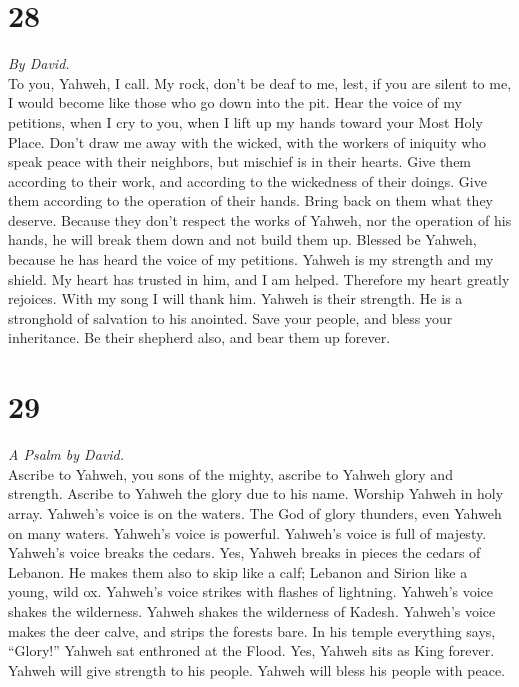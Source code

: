 \hypertarget{section-27}{%
\section{28}\label{section-27}}

\emph{By David.}\\
 To you, Yahweh, I call. My rock, don't be deaf to me,
lest, if you are silent to me, I would become like those who go down
into the pit.  Hear the voice of my petitions, when I cry
to you, when I lift up my hands toward your Most Holy Place.
 Don't draw me away with the wicked, with the workers of
iniquity who speak peace with their neighbors, but mischief is in their
hearts.  Give them according to their work, and according
to the wickedness of their doings. Give them according to the operation
of their hands. Bring back on them what they deserve. 
Because they don't respect the works of Yahweh, nor the operation of his
hands, he will break them down and not build them up. 
Blessed be Yahweh, because he has heard the voice of my petitions.
 Yahweh is my strength and my shield. My heart has trusted
in him, and I am helped. Therefore my heart greatly rejoices. With my
song I will thank him.  Yahweh is their strength. He is a
stronghold of salvation to his anointed.  Save your
people, and bless your inheritance. Be their shepherd also, and bear
them up forever.

\hypertarget{section-28}{%
\section{29}\label{section-28}}

\emph{A Psalm by David.}\\
 Ascribe to Yahweh, you sons of the mighty, ascribe to
Yahweh glory and strength.  Ascribe to Yahweh the glory
due to his name. Worship Yahweh in holy array.  Yahweh's
voice is on the waters. The God of glory thunders, even Yahweh on many
waters.  Yahweh's voice is powerful. Yahweh's voice is
full of majesty.  Yahweh's voice breaks the cedars. Yes,
Yahweh breaks in pieces the cedars of Lebanon.  He makes
them also to skip like a calf; Lebanon and Sirion like a young, wild ox.
 Yahweh's voice strikes with flashes of lightning.
 Yahweh's voice shakes the wilderness. Yahweh shakes the
wilderness of Kadesh.  Yahweh's voice makes the deer
calve, and strips the forests bare. In his temple everything says,
``Glory!''  Yahweh sat enthroned at the Flood. Yes,
Yahweh sits as King forever.  Yahweh will give strength
to his people. Yahweh will bless his people with peace.

